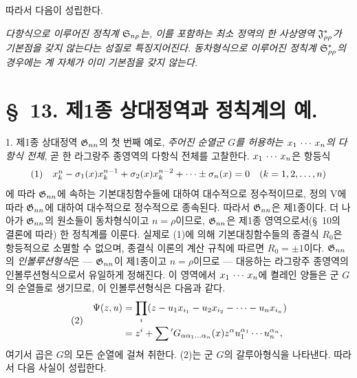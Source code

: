 따라서 다음이 성립한다.

\emph{다항식으로 이루어진 정칙계 $\mathfrak S_{n\rho}$는, 이를 포함하는 최소 정역의 한 사상영역 $\mathfrak J^*_{\rho\rho}$가 기본점을 갖지 않는다는 성질로 특징지어진다. 동차형식으로 이루어진 정칙계 $\mathfrak S^*_{\rho\rho}$의 경우에는 계 자체가 이미 기본점을 갖지 않는다.}

\section*{\S\ 13. 제1종 상대정역과 정칙계의 예.}

1. 제1종 상대정역 $\mathfrak G_{nn}$의 첫 번째 예로, \emph{주어진 순열군 $G$를 허용하는 $x_1\,\cdots\, x_n$의 다항식 전체}, 곧 한 라그랑주 종영역의 다항식 전체를 고찰한다. $x_1\,\cdots\, x_n$은 항등식
\[
\begin{array}{@{}l@{\quad}c@{}}
(1)& x_k^n-\sigma_1(x)x_k^{n-1}+\sigma_2(x)x_k^{n-2}+\cdots\pm\sigma_n(x)=0\quad(k=1,2,\ldots,n)
\end{array}
\]
에 따라 $\mathfrak G_{nn}$에 속하는 기본대칭함수들에 대하여 대수적으로 정수적이므로, 정의 V에 따라 $\mathfrak G_{nn}$에 대하여 대수적으로 정수적으로 종속된다. 따라서 $\mathfrak G_{nn}$은 제1종이다. 더 나아가 $\mathfrak G_{nn}$의 원소들이 동차형식이고 $n=\rho$이므로, $\mathfrak G_{nn}$은 제1종 영역으로서(\S\ 10의 결론에 따라) 한 정칙계를 이룬다. 실제로 (1)에 의해 기본대칭함수들의 종결식 $R_0$은 항등적으로 소멸할 수 없으며, 종결식 이론의 계산 규칙에 따르면 $R_0=\pm1$이다. $\mathfrak G_{nn}$의 \emph{인볼루션형식}은 --- $\mathfrak G_{nn}$이 제1종이고 $n=\rho$이므로 --- 대응하는 라그랑주 종영역의 인볼루션형식으로서 유일하게 정해진다. 이 영역에서 $x_1\,\cdots\, x_n$에 켤레인 양들은 군 $G$의 순열들로 생기므로, 이 인볼루션형식은 다음과 같다.
\[
\begin{array}{@{}l@{\quad}c@{}}
(2)&
\begin{aligned}
  \Psi(z,u)&=\prod_i
  (z-u_1x_{i_1}-u_2x_{i_2}-\cdots-u_nx_{i_n})\\
  &=z^i+\sum{}'G_{\alpha\alpha_1\ldots\alpha_n}(x)
  z^\alpha u_1^{\alpha_1}\cdots u_n^{\alpha_n},
\end{aligned}
\end{array}
\]
여기서 곱은 $G$의 모든 순열에 걸쳐 취한다. (2)는 \glqq{}군 $G$의 갈루아형식\grqq{}을 나타낸다. 따라서 다음 사실이 성립한다.

